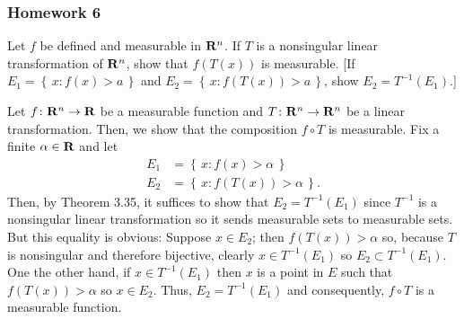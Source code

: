 \subsubsection{Homework 6}
\setcounter{exercise}{0}
\setcounter{equation}{0}

\begin{problem}
  Let $f$ be defined and measurable in $\mathbf{R}^n$. If $T$ is a nonsingular
  linear transformation of $\mathbf{R}^n$, show that $f(T(x))$ is measurable. [If
  $E_1=\left\{\,x: f(x)>a\,\right\}$ and
  $E_2=\left\{\,x:f(T(x))>a\,\right\}$, show $E_2=T^{-1}(E_1)$.]
\end{problem}
\begin{solution}
  Let $f\colon\mathbf{R}^n\to\mathbf{R}$ be a measurable function and
  $T\colon\mathbf{R}^n\to\mathbf{R}^n$ be a linear transformation. Then, we show that
  the composition $f\circ T$ is measurable. Fix a finite $\alpha\in\mathbf{R}$
  and let
  \begin{align*}
    E_1&=\left\{\,x:f(x)>\alpha\,\right\}\\
    E_2&=\left\{\,x:f(T(x))>\alpha\,\right\}.
  \end{align*}
  Then, by Theorem 3.35, it suffices to show that $E_2=T^{-1}(E_1)$ since
  $T^{-1}$ is a nonsingular linear transformation so it sends measurable
  sets to measurable sets. But this equality is obvious: Suppose
  $x\in E_2$; then $f(T(x))>\alpha$ so, because $T$ is nonsingular and
  therefore bijective, clearly $x\in T^{-1}(E_1)$ so $E_2\subset
  T^{-1}(E_1)$. One the other hand, if $x\in T^{-1}(E_1)$ then $x$ is a
  point in $E$ such that $f(T(x))>\alpha$ so $x\in E_2$. Thus,
  $E_2=T^{-1}(E_1)$ and consequently, $f\circ T$ is a measurable function.
\end{solution}

